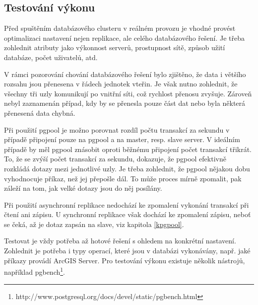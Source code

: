 \clearpage
\subsection{Testování výkonu}
\label{kpgbench}
Před spuštěním databázového clusteru v reálném provozu je vhodné provést
optimalizaci nastavení nejen replikace, ale celého databázového řešení. Je třeba
zohlednit atributy jako výkonnost serverů, prostupnost sítě, způsob užití
databáze, počet uživatelů, atd.

V rámci pozorování chování databázového řešení bylo zjištěno, že data i většího
rozsahu jsou přenesena v řádech jednotek vteřin. Je však nutno zohlednit, že
všechny tři uzly komunikují po vnitřní síti, což rychlost přenosu zvyšuje.
Zároveň nebyl za\-zna\-me\-nán případ, kdy by se přenesla pouze část dat nebo byla
některá přenesená data chybná.

Při použití pgpool je možno porovnat rozdíl počtu transakcí za sekundu v případě
připojení pouze na pgpool a na master, resp. slave server. V ideálním případě by
měl pgpool znásobit oproti běžnému připojení počet transakcí třikrát. To, že se zvýší počet transakcí za
sekundu, dokazuje, že pgpool efektivně rozkládá dotazy mezi jednotlivé uzly. Je
třeba zohlednit, že pgpool nějakou dobu vyhodnocuje příkaz, než jej přepošle
dál. To může proces mírně zpomalit, pak záleží na tom, jak velké dotazy jsou do
něj posílány.

Při použití asynchronní replikace nedochází ke zpomalení vykonání transakcí při
čtení ani zápisu. U synchronní replikace však dochází ke zpomalení zápisu, neboť
se čeká, až je dotaz zapsán na slave, viz kapitola \ref{kpgpool}.

Testovat je vždy potřeba až hotové řešení s ohledem na konkrétní nastavení.
Zohlednit je potřeba i typy operací, které jsou v databázi vykonávány, např.
jaké příkazy provádí ArcGIS Server.  Pro testování výkonu existuje několik
nástrojů, například pgbench\footnote{http://www.postgresql.org/docs/devel/static/pgbench.html}.
